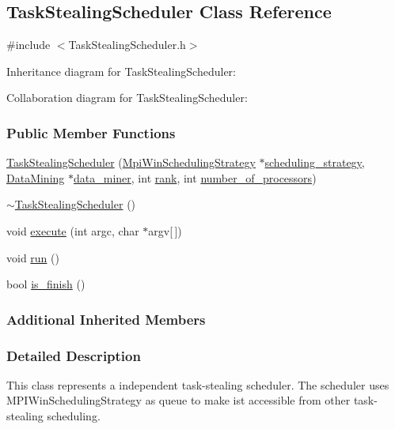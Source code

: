 \hypertarget{a00038}{}\subsection{Task\+Stealing\+Scheduler Class Reference}
\label{a00038}


{\ttfamily \#include $<$Task\+Stealing\+Scheduler.\+h$>$}



Inheritance diagram for Task\+Stealing\+Scheduler\+:


Collaboration diagram for Task\+Stealing\+Scheduler\+:
\subsubsection*{Public Member Functions}
\begin{DoxyCompactItemize}
\item 
\hyperlink{a00038_af893fa98efeda805d0632c77b8a7ea8e}{Task\+Stealing\+Scheduler} (\hyperlink{a00031}{Mpi\+Win\+Scheduling\+Strategy} $\ast$\hyperlink{a00004_a7dd11eee79bfb44c820d6c28480fd0c7}{scheduling\+\_\+strategy}, \hyperlink{a00013}{Data\+Mining} $\ast$\hyperlink{a00004_a6e281d90fa4b965779cd13eabf7d0249}{data\+\_\+miner}, int \hyperlink{a00015_a33c24e2887b4d9c4ef7f3566d3bc803e}{rank}, int \hyperlink{a00015_a4e798bde66d26fe200de7e8d2b54e915}{number\+\_\+of\+\_\+processors})
\item 
\hyperlink{a00038_a4ac70e3f8599b547ba886ff895e70d12}{$\sim$\+Task\+Stealing\+Scheduler} ()
\item 
void \hyperlink{a00038_a8e2a2515ccc6021980508ba085f104fa}{execute} (int argc, char $\ast$argv\mbox{[}$\,$\mbox{]})
\item 
void \hyperlink{a00038_a362edbac4a417c08ee8b19a364cc97bb}{run} ()
\item 
bool \hyperlink{a00038_a4d411046663ce0d63f4f70505aa51a2d}{is\+\_\+finish} ()
\end{DoxyCompactItemize}
\subsubsection*{Additional Inherited Members}


\subsubsection{Detailed Description}
This class represents a independent task-\/stealing scheduler. The scheduler uses M\+P\+I\+Win\+Scheduling\+Strategy as queue to make ist accessible from other task-\/stealing scheduling.

